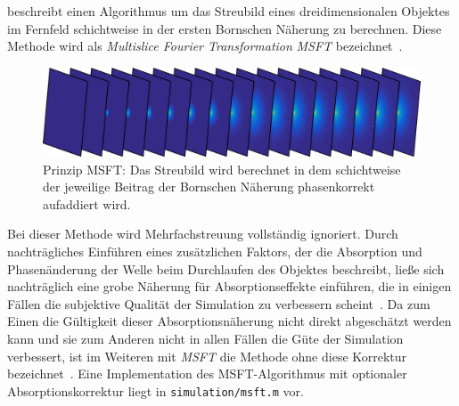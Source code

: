  beschreibt einen Algorithmus um das Streubild eines dreidimensionalen Objektes im Fernfeld schichtweise in der ersten Bornschen Näherung zu berechnen. Diese Methode wird als \textit{Multislice Fourier Transformation} \textit{MSFT} bezeichnet~\cite{barke2015}. 

\begin{figure}
	\centering
	\includegraphics[width=1\textwidth]{images/slice_msft.png}
	\caption[Prinzip MSFT]{Prinzip MSFT: Das Streubild wird berechnet in dem schichtweise der jeweilige Beitrag der Bornschen Näherung phasenkorrekt aufaddiert wird.}
	\label{fig:slice_msft}
\end{figure} 

Bei dieser Methode wird Mehrfachstreuung vollständig ignoriert. Durch nachträgliches Einführen eines zusätzlichen Faktors, der die Absorption und Phasenänderung der Welle beim Durchlaufen des Objektes beschreibt, ließe sich nachträglich eine grobe Näherung für Absorptionseffekte einführen, die in einigen Fällen die subjektive Qualität der Simulation zu verbessern scheint~\cite{barke2015}. Da zum Einen die Gültigkeit dieser Absorptionsnäherung nicht direkt abgeschätzt werden kann und sie zum Anderen nicht in allen Fällen die Güte der Simulation verbessert, ist im Weiteren mit \textit{MSFT} die Methode ohne diese Korrektur bezeichnet~\cite{fennel}.
Eine Implementation des MSFT-Algorithmus mit optionaler Absorptionskorrektur liegt in \texttt{simulation/msft.m} vor. 

